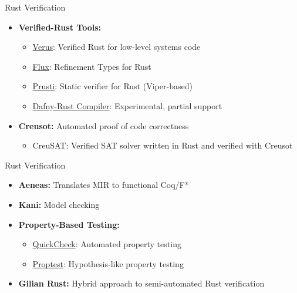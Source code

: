 \documentclass{beamer}
\begin{document}
\begin{frame}{Rust Verification}
    \begin{itemize}
        \item \textbf{Verified-Rust Tools:}
        \begin{itemize}
            \item \href{https://github.com/verus-lang/verus}{Verus}: Verified Rust for low-level systems code
            \item \href{https://github.com/flux-rs/flux}{Flux}: Refinement Types for Rust
            \item \href{https://github.com/viperproject/prusti-dev}{Prusti}: Static verifier for Rust (Viper-based)
            \item \href{https://github.com/dafny-lang/dafny/issues/5561}{Dafny-Rust Compiler}: Experimental, partial support
        \end{itemize}
        \item \textbf{Creusot:} Automated proof of code correctness
        \begin{itemize}
            \item CreuSAT: Verified SAT solver written in Rust and verified with Creusot
        \end{itemize}
    \end{itemize}
 \end{frame}
        
   \begin{frame}{Rust Verification}
    \begin{itemize}     
        \item \textbf{Aeneas:} Translates MIR to functional Coq/F*
        \item \textbf{Kani:} Model checking
        \item \textbf{Property-Based Testing:}
        \begin{itemize}
            \item \href{https://github.com/BurntSushi/quickcheck}{QuickCheck}: Automated property testing
            \item \href{https://github.com/proptest-rs/proptest}{Proptest}: Hypothesis-like property testing
        \end{itemize}
        \item \textbf{Gilian Rust:} Hybrid approach to semi-automated Rust verification
    \end{itemize}
\end{frame}
\end{document}
